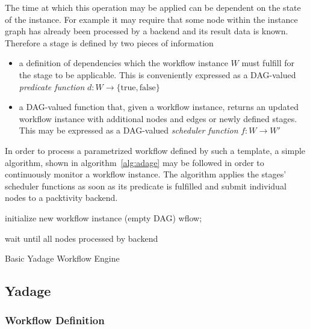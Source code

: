 \documentclass[a4paper]{jpconf}
\begin{document}
The time at which this operation may be applied can be dependent on the state of the instance. For example it may require that some node within the instance graph has already been processed by a backend and its result data is known. Therefore a stage is defined by two pieces of information

\begin{itemize}
	\item a definition of dependencies which the workflow instance $W$ must fulfill for the stage to be applicable. This is conveniently expressed as a DAG-valued \emph{predicate function} $d: W\to \{\mathrm{true},\mathrm{false}\}$
	\item a DAG-valued function that, given a workflow instance, returns an updated workflow instance with additional nodes and edges or newly defined stages. This may be expressed as a DAG-valued \emph{scheduler function} $f: W\to W'$
\end{itemize}

In order to process a parametrized workflow defined by such a template, a simple algorithm, shown in algorithm~\ref{alg:adage} may be followed in order to continuously monitor a workflow instance. The algorithm applies the stages' scheduler functions as soon as its predicate is fulfilled and submit individual nodes to a packtivity backend.

\begin{algorithm}[H]
\footnotesize
 initialize new workflow instance (empty DAG) wflow;

 wait until all nodes processed by backend
 \caption{Basic Yadage Workflow Engine}
 \label{alg:adage}
\end{algorithm}

\subsection{Yadage}

\subsubsection{Workflow Definition}
\end{document}
